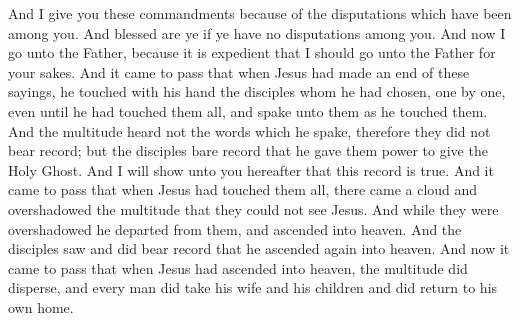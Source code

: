 And I give you these commandments because of the disputations which have been among you. And blessed are ye if ye have no disputations among you.
\bverse \iffalse And now I go unto the Father, because it is expedient that I should go unto the Father for your sakes. \fi
And now I go unto the Father, because it is expedient that I should go unto the Father for your sakes.
\bverse \iffalse And it came to pass that when Jesus had made an end of these sayings, he touched with his hand the disciples whom he had chosen, one by one, even until he had touched them all, and spake unto them as he touched them. \fi
And it came to pass that when Jesus had made an end of these sayings, he touched with his hand the disciples whom he had chosen, one by one, even until he had touched them all, and spake unto them as he touched them.
\bverse \iffalse And the multitude heard not the words which he spake, therefore they did not bear record; but the disciples bare record that he gave them power to give the Holy Ghost. And I will show unto you hereafter that this record is true. \fi
And the multitude heard not the words which he spake, therefore they did not bear record; but the disciples bare record that he gave them power to give the Holy Ghost. And I will show unto you hereafter that this record is true.
\bverse \iffalse And it came to pass that when Jesus had touched them all, there came a cloud and overshadowed the multitude that they could not see Jesus. \fi
And it came to pass that when Jesus had touched them all, there came a cloud and overshadowed the multitude that they could not see Jesus.
\bverse \iffalse And while they were overshadowed he departed from them, and ascended into heaven. And the disciples saw and did bear record that he ascended again into heaven. \fi
And while they were overshadowed he departed from them, and ascended into heaven. And the disciples saw and did bear record that he ascended again into heaven.
\bchapter
\bverse \iffalse And now it came to pass that when Jesus had ascended into heaven, the multitude did disperse, and every man did take his wife and his children and did return to his own home. \fi
And now it came to pass that when Jesus had ascended into heaven, the multitude did disperse, and every man did take his wife and his children and did return to his own home.
\bverse \iffalse And it was noised abroad among the people immediately, before it was yet dark, that the multitude had seen Jesus, and that he had ministered unto them, and that he would also show himself on the morrow unto the multitude. \fi
